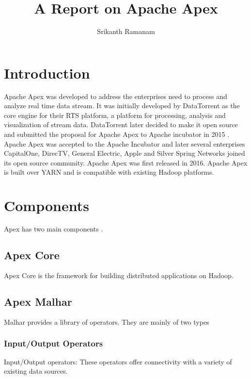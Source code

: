 \documentclass[9pt,twocolumn,twoside]{../../styles/osajnl}
\title{A Report on Apache Apex}
\author[1]{Srikanth Ramanam}
\affil[1]{School of Informatics and Computing, Bloomington, IN 47408, U.S.A.}
\affil[*]{Corresponding authors: srikrama@iu.edu}
\begin{document}
\maketitle

\section{Introduction}
Apache Apex was developed to address the enterprises need to process and analyze real time data stream. It was initially developed by DataTorrent as the core engine for their RTS platform, a platform for processing, analysis and visualization of stream data. DataTorrent later decided to make it open source and submitted the proposal for Apache Apex to Apache incubator in 2015 \cite{www-datatorrentapex}. Apache Apex was accepted to the Apache Incubator and later several enterprises CapitalOne, DirecTV, General Electric, Apple and Silver Spring Networks joined its open source community. Apache Apex was first released in 2016. Apache Apex is built over YARN and is compatible with existing Hadoop platforms.







\section{Components}
Apex has two main components \cite{www-apacheapexwiki}.
\subsection{Apex Core}
Apex Core is the framework for building distributed applications on Hadoop.
\subsection{Apex Malhar}
Malhar provides a library of operators. They are mainly of two types
\subsubsection{Input/Output Operators}
Input/Output operators: These operators offer connectivity with a variety of existing data sources.
\end{document}
